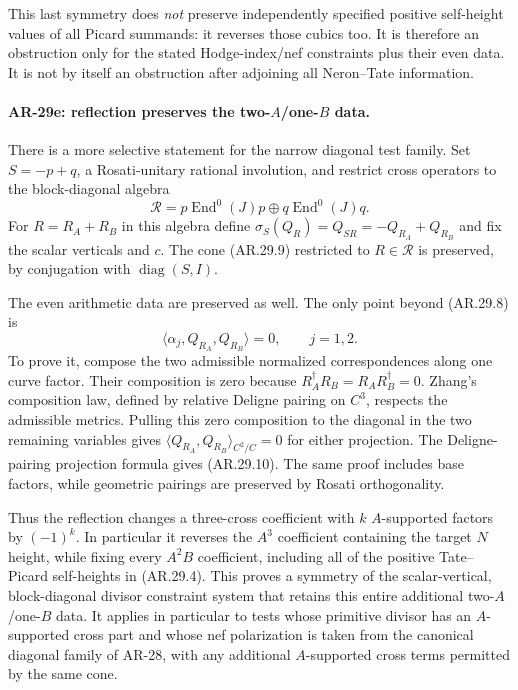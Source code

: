 This last symmetry does \emph{not} preserve independently specified
positive self-height values of all Picard summands: it reverses
those cubics too.  It is therefore an obstruction only for the
stated Hodge-index/nef constraints plus their even data.  It is
not by itself an obstruction after adjoining all Neron--Tate
information.

\paragraph{AR-29e: reflection preserves the two-$A$/one-$B$ data.}
There is a more selective statement for the narrow diagonal test
family.  Set $S=-p+q$, a Rosati-unitary rational involution, and
restrict cross operators to the block-diagonal algebra
\[
 \mathcal R=p\operatorname{End}^0(J)p
                 \oplus q\operatorname{End}^0(J)q.
\]
For $R=R_A+R_B$ in this algebra define
$\sigma_S(Q_R)=Q_{SR}=-Q_{R_A}+Q_{R_B}$ and fix the scalar
verticals and $c$.  The cone (AR.29.9) restricted to
$R\in\mathcal R$ is preserved, by conjugation with
$\operatorname{diag}(S,I)$.

The even arithmetic data are preserved as well.  The only point
beyond (AR.29.8) is
\[
 \langle\alpha_j,Q_{R_A},Q_{R_B}\rangle=0,
 \qquad j=1,2.                                          \tag{AR.29.10}
\]
To prove it, compose the two admissible normalized correspondences
along one curve factor.  Their composition is zero because
$R_A^\dagger R_B=R_A R_B^\dagger=0$.
Zhang's composition law, defined by relative Deligne pairing on
$C^3$, respects the admissible metrics.  Pulling this zero
composition to the diagonal in the two remaining variables gives
$\langle Q_{R_A},Q_{R_B}\rangle_{C^2/C}=0$ for either projection.
The Deligne-pairing projection formula gives (AR.29.10).
The same proof includes base factors, while geometric pairings
are preserved by Rosati orthogonality.

Thus the reflection changes a three-cross coefficient with $k$
$A$-supported factors by $(-1)^k$.  In particular it reverses the
$A^3$ coefficient containing the target $N$ height, while fixing
every $A^2B$ coefficient, including all of the positive
Tate--Picard self-heights in (AR.29.4).  This proves a symmetry
of the scalar-vertical, block-diagonal divisor constraint system
that retains this entire additional two-$A$/one-$B$ data.
It applies in particular to tests whose primitive divisor has an
$A$-supported cross part and whose nef polarization is taken from
the canonical diagonal family of AR-28, with any additional
$A$-supported cross terms permitted by the same cone.

